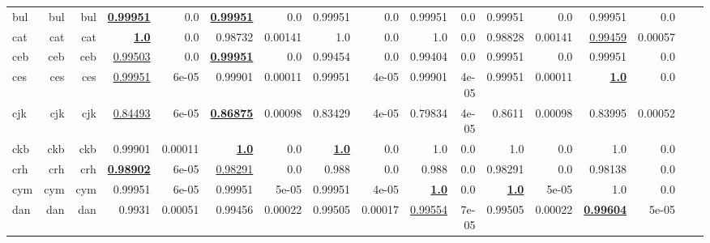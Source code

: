 \documentclass[11pt]{article}
\begin{document}
\begin{table*}[h]
{\begin{tabular}{lrrrrrrrrrrrrrrrr}
bul         & bul         & bul         & \textbf{\underline{0.99951}}         & 0.0         & \textbf{\underline{0.99951}}         & 0.0         & 0.99951         & 0.0         & 0.99951         & 0.0         & 0.99951         & 0.0         & 0.99951         & 0.0         \\
cat         & cat         & cat         & \textbf{\underline{1.0}}         & 0.0         & 0.98732         & 0.00141         & 1.0         & 0.0         & 1.0         & 0.0         & 0.98828         & 0.00141         & \underline{0.99459}         & 0.00057         \\
ceb         & ceb         & ceb         & \underline{0.99503}         & 0.0         & \textbf{\underline{0.99951}}         & 0.0         & 0.99454         & 0.0         & 0.99404         & 0.0         & 0.99951         & 0.0         & 0.99951         & 0.0         \\
ces         & ces         & ces         & \underline{0.99951}         & 6e-05         & 0.99901         & 0.00011         & 0.99951         & 4e-05         & 0.99901         & 4e-05         & 0.99951         & 0.00011         & \textbf{\underline{1.0}}         & 0.0         \\
cjk         & cjk         & cjk         & \underline{0.84493}         & 6e-05         & \textbf{\underline{0.86875}}         & 0.00098         & 0.83429         & 4e-05         & 0.79834         & 4e-05         & 0.8611         & 0.00098         & 0.83995         & 0.00052         \\
ckb         & ckb         & ckb         & 0.99901         & 0.00011         & \textbf{\underline{1.0}}         & 0.0         & \textbf{\underline{1.0}}         & 0.0         & 1.0         & 0.0         & 1.0         & 0.0         & 1.0         & 0.0         \\
crh         & crh         & crh         & \textbf{\underline{0.98902}}         & 6e-05         & \underline{0.98291}         & 0.0         & 0.988         & 0.0         & 0.988         & 0.0         & 0.98291         & 0.0         & 0.98138         & 0.0         \\
cym         & cym         & cym         & 0.99951         & 6e-05         & 0.99951         & 5e-05         & 0.99951         & 4e-05         & \textbf{\underline{1.0}}         & 0.0         & \textbf{\underline{1.0}}         & 5e-05         & 1.0         & 0.0         \\
dan         & dan         & dan         & 0.9931         & 0.00051         & 0.99456         & 0.00022         & 0.99505         & 0.00017         & \underline{0.99554}         & 7e-05         & 0.99505         & 0.00022         & \textbf{\underline{0.99604}}         & 5e-05         \\

\end{tabular}}
\end{table*}
\end{document}
